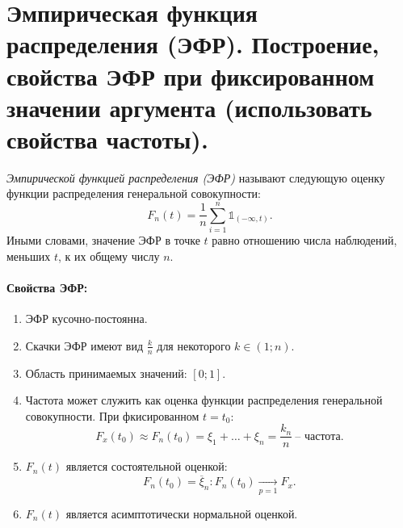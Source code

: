 \section{Эмпирическая функция распределения (ЭФР). Построение, свойства ЭФР при
 фиксированном значении аргумента (использовать свойства частоты).}

 \begin{definition}
   \textit{Эмпирической функцией распределения (ЭФР)} называют следующую оценку
   функции распределения генеральной совокупности:
   \[
     F_n(t) = \frac{1}{n} \sum_{i = 1}^{n} \mathbb{1}_{(-\infty, t)}
   .\]
   Иными словами, значение ЭФР в точке $t$ равно отношению числа наблюдений,
   меньших $t$, к их общему числу $n$.
 \end{definition}

\paragraph{Свойства ЭФР:}

\begin{enumerate}
  \item ЭФР кусочно-постоянна.
  \item Скачки ЭФР имеют вид $\frac{k}{n}$ для некоторого $k \in (1; n)$.
  \item Область принимаемых значений: $[0; 1]$.
  \item Частота может служить как оценка функции распределения генеральной
  совокупности. При фкисированном $t = t_0$:
  \[
    F_x(t_0) \approx F_n(t_0) = \xi_1 + \ldots + \xi_n =
    \frac{k_n}{n}~ \text{-- частота}
  .\]
  \item $F_n(t)$ является состоятельной оценкой:
  \[
    F_n(t_0) = \overline{\xi}_n: F_n(t_0) \xrightarrow[p = 1]{} F_x
  .\]
  \item $F_n(t)$ является асимптотически нормальной оценкой.
\end{enumerate}
